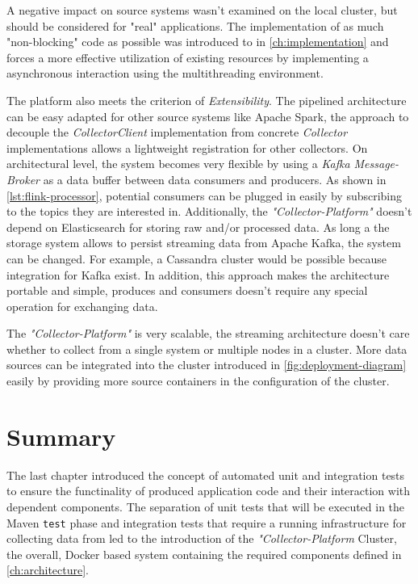 A negative impact on source systems wasn't examined on the local cluster, but should be considered for "real" applications. The implementation
of as much "non-blocking" code as possible was introduced to in \autoref{ch:implementation} and forces a more effective utilization
of existing resources by implementing a asynchronous interaction using the multithreading environment.

The platform also meets the criterion of \textit{Extensibility}. The pipelined architecture can be easy adapted for other source systems
like Apache Spark, the approach to decouple the \textit{CollectorClient} implementation from concrete \textit{Collector} implementations
allows a lightweight registration for other collectors. On architectural level, the system becomes very flexible by using a \textit{Kafka Message-Broker}
as a data buffer between data consumers and producers. As shown in \autoref{lst:flink-processor}, potential consumers can be plugged in easily
by subscribing to the topics they are interested in. Additionally, the \textit{"Collector-Platform"} doesn't depend on Elasticsearch
for storing raw and/or processed data. As long a the storage system allows to persist streaming data from Apache Kafka, the system can be changed.
For example, a Cassandra cluster would be possible because integration for Kafka exist. In addition, this approach makes the architecture portable
and simple, produces and consumers doesn't require any special operation for exchanging data.

The \textit{"Collector-Platform"} is very scalable, the streaming architecture doesn't care whether to collect from a single system
or multiple nodes in a cluster. More data sources can be integrated into the cluster introduced in \autoref{fig:deployment-diagram} easily
by providing more source containers in the configuration of the cluster.

\section{Summary}

The last chapter introduced the concept of automated unit and integration tests to ensure the functinality of produced application code and their
interaction with dependent components. The separation of unit tests that will be executed in the Maven \verb|test| phase and integration
tests that require a running infrastructure for collecting data from led to the introduction of the \textit{"Collector-Platform} Cluster,
the overall, Docker based system containing the required components defined in \autoref{ch:architecture}.

